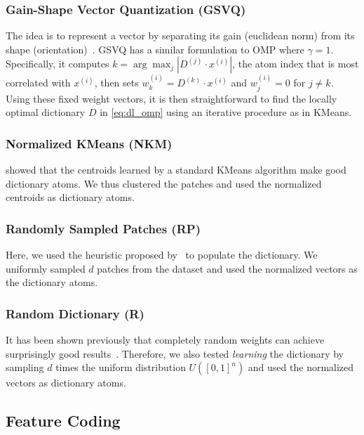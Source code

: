 \documentclass[svgnames]{scrartcl}
\begin{document}
\subsubsection{Gain-Shape Vector Quantization (GSVQ)}

The idea is to represent a vector by separating its gain (euclidean norm) from its shape (orientation)~\citep{gersho2012vector}. GSVQ has a similar formulation to OMP where $\gamma=1$. Specifically, it computes $k = \arg \max_j | D^{(j)} \cdot x^{(i)} |$, the atom index that is most correlated with $x^{(i)}$, then sets $w^{(i)}_k = D^{(k)} \cdot x^{(i)}$ and $w^{(i)}_j = 0$ for $j \neq k$. Using these fixed weight vectors, it is then straightforward to find the locally optimal dictionary $D$ in \eqref{eq:dl_omp} using an iterative procedure as in KMeans.

\subsubsection{Normalized KMeans (NKM)}

\citet{coates2011analysis} showed that the centroids learned by a standard KMeans algorithm make good dictionary atoms. We thus clustered the patches and used the normalized centroids as dictionary atoms.

\subsubsection{Randomly Sampled Patches (RP)}

Here, we used the heuristic proposed by~\citet{coates2011importance} to populate the dictionary. We uniformly sampled $d$ patches from the dataset and used the normalized vectors as the dictionary atoms.

\subsubsection{Random Dictionary (R)}

It has been shown previously that completely random weights can achieve surprisingly good results~\citep{coates2011importance, saxe2011random}. Therefore, we also tested \textit{learning} the dictionary by sampling $d$ times the uniform distribution $U\left( [0,1]^n \right)$ and used the normalized vectors as dictionary atoms.



\subsection{Feature Coding}
\end{document}
